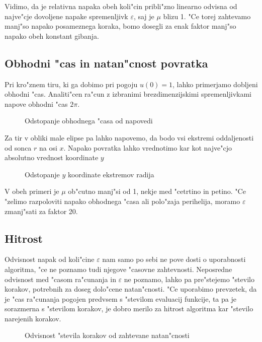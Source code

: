 \documentclass[a4paper,10pt]{article}
\newcommand{\eps}{\varepsilon}
\begin{document}
Vidimo, da je relativna napaka obeh koli"cin pribli"zno linearno odvisna od najve"cje dovoljene napake spremenljivk $\eps$, saj je $\mu$ blizu 1. "Ce torej zahtevamo manj"so napako posameznega koraka, bomo dosegli za enak faktor manj"so napako obeh konstant gibanja. 

\subsection{Obhodni "cas in natan"cnost povratka}

Pri kro"znem tiru, ki ga dobimo pri pogoju $u(0) = 1$, lahko primerjamo dobljeni obhodni "cas. Analiti"cen ra"cun z izbranimi brezdimenzijskimi spremenljivkami napove obhodni "cas $2\pi$. 


\begin{figure}[H]
 \centering
 
 \caption{Odstopanje obhodnega "casa od napovedi}
 \label{fig:test-cas}
\end{figure}

Za tir v obliki male elipse pa lahko napovemo, da bodo vsi ekstremi oddaljenosti od sonca $r$ na osi $x$. Napako povratka lahko vrednotimo kar kot najve"cjo absolutno vrednost koordinate $y$ 

\begin{figure}[H]
 \centering
 
 \caption{Odstopanje $y$ koordinate ekstremov radija}
 \label{fig:test-povratek}
\end{figure}

V obeh primeri je $\mu$ ob"cutno manj"si od 1, nekje med "cetrtino in petino. "Ce "zelimo razpoloviti napako obhodnega "casa ali polo"zaja perihelija, moramo $\eps$ zmanj"sati za faktor 20. 

\subsection{Hitrost}

Odvisnost napak od koli"cine $\eps$ nam samo po sebi ne pove dosti o uporabnosti algoritma, "ce ne poznamo tudi njegove "casovne zahtevnosti. Neposredne odvisnost med "casom ra"cunanja in $\eps$ ne poznamo, lahko pa pre"stejemo "stevilo korakov, potrebnih za doseg dolo"cene natan"cnosti. "Ce uporabimo prevzetek, da je "cas ra"cunanja pogojen predvsem s "stevilom evaluacij funkcije, ta pa je sorazmerna s "stevilom korakov, je dobro merilo za hitrost algoritma kar "stevilo narejenih korakov. 

\begin{figure}[H]
 \centering
 
 \caption{Odvisnost "stevila korakov od zahtevane natan"cnosti}
 \label{fig:test-hitrost}
\end{figure}
\end{document}
